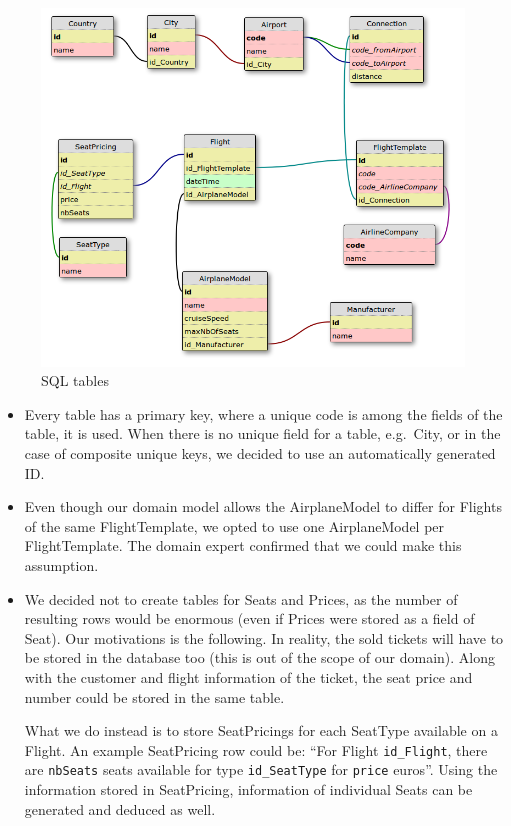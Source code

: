 \documentclass[a4paper]{article}
\newcommand{\cc}[1]{\texttt{#1}}
\begin{document}
\begin{figure}[ht!]
  \includegraphics[width=1.0\textwidth]{../analysis/dbtables-diagram.png}
  \caption{SQL tables}\label{fig:database-tables}
\end{figure}

\begin{itemize}
\item Every table has a primary key, where a unique code is among the fields of the table, it is used.
  When there is no unique field for a table, e.g.\ City, or in the case of composite unique keys, we decided to use an automatically generated ID.
\item Even though our domain model allows the AirplaneModel to differ for Flights of the same FlightTemplate, we opted to use one AirplaneModel per FlightTemplate.
  The domain expert confirmed that we could make this assumption. %
\item We decided not to create tables for Seats and Prices, as the number of resulting rows would be enormous (even if Prices were stored as a field of Seat).
  Our motivations is the following.
  In reality, the sold tickets will have to be stored in the database too (this is out of the scope of our domain).
  Along with the customer and flight information of the ticket, the seat price and number could be stored in the same table.

  What we do instead is to store SeatPricings for each SeatType available on a Flight.
  An example SeatPricing row could be: ``For Flight \cc{id\_Flight}, there are \cc{nbSeats} seats available for type \cc{id\_SeatType} for \cc{price} euros''.
  Using the information stored in SeatPricing, information of individual Seats can be generated and deduced as well.
\end{itemize}
\end{document}
